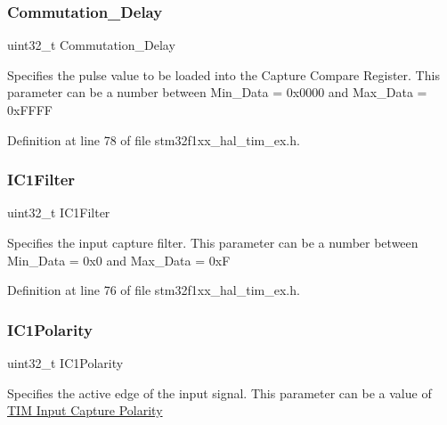 \subsubsection{\texorpdfstring{Commutation\+\_\+\+Delay}{Commutation\_Delay}}
{\footnotesize\ttfamily uint32\+\_\+t Commutation\+\_\+\+Delay}

Specifies the pulse value to be loaded into the Capture Compare Register. This parameter can be a number between Min\+\_\+\+Data = 0x0000 and Max\+\_\+\+Data = 0x\+F\+F\+FF 

Definition at line 78 of file stm32f1xx\+\_\+hal\+\_\+tim\+\_\+ex.\+h.

\mbox{\label{struct_t_i_m___hall_sensor___init_type_def_a5efa2ad5085fe72fb0b5dc2e2fc61def}} 
\subsubsection{\texorpdfstring{I\+C1\+Filter}{IC1Filter}}
{\footnotesize\ttfamily uint32\+\_\+t I\+C1\+Filter}

Specifies the input capture filter. This parameter can be a number between Min\+\_\+\+Data = 0x0 and Max\+\_\+\+Data = 0xF 

Definition at line 76 of file stm32f1xx\+\_\+hal\+\_\+tim\+\_\+ex.\+h.

\mbox{\label{struct_t_i_m___hall_sensor___init_type_def_ac1191c7421a3ca4c53ec7875870812e5}} 
\subsubsection{\texorpdfstring{I\+C1\+Polarity}{IC1Polarity}}
{\footnotesize\ttfamily uint32\+\_\+t I\+C1\+Polarity}

Specifies the active edge of the input signal. This parameter can be a value of \hyperlink{group___t_i_m___input___capture___polarity}{T\+IM Input Capture Polarity} 

